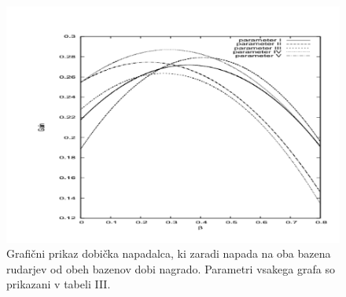 \documentclass[12pt]{article}
\begin{document}
\begin{figure}
  \includegraphics[scale=0.6]{image7_2.png}
  \caption{Grafični prikaz dobička napadalca, ki zaradi napada na oba bazena rudarjev od obeh bazenov dobi nagrado. Parametri vsakega grafa so prikazani v tabeli III.}
  \label{fig:boat1}
\end{figure}
\end{document}
